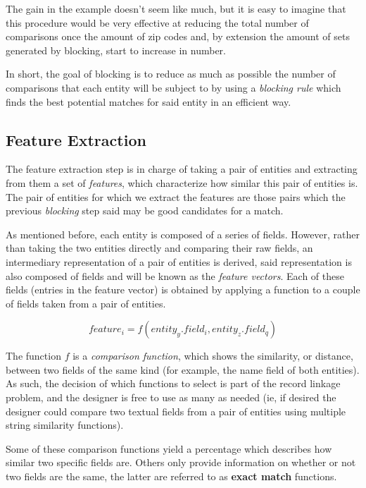 \documentclass[epsfig,a4paper,11pt,titlepage,twoside,openany]{book}
\begin{document}
The gain in the example doesn't seem like much, but it is easy to imagine that
this procedure would be very effective at reducing the total number of
comparisons once the amount of zip codes and, by extension the amount of sets
generated by blocking, start to increase in number.

In short, the goal of blocking is to reduce as much as possible the number of
comparisons that each entity will be subject to by using a \textit{blocking
  rule} which finds the best potential matches for said entity in an efficient
way.

  
\subsection{Feature Extraction}
\label{sec:rl-workflow-feat-extraction}

The feature extraction step is in charge of taking a pair of entities and
extracting from them a set of \textit{features}, which characterize how similar
this pair of entities is. The pair of entities for which we extract the features
are those pairs which the previous \textit{blocking} step said may be good
candidates for a match.

As mentioned before, each entity is composed of a series of fields. 
However, rather than
taking the two entities directly and comparing their raw fields, an intermediary representation of a pair of entities is derived, said representation is also
composed of fields and will be known as the \textit{feature vectors}. Each of
these fields (entries in the feature vector) is obtained by applying a function
to a couple of fields taken from a pair of entities.

$$
feature_i = f(entity_y.field_i , entity_z.field_q)
$$

The function $f$ is a \textit{comparison function}, which shows the
similarity, or distance, between two fields of the same kind (for example, the
name field of both entities). As such, the decision of which functions to select is
part of the record linkage problem, and the designer is free to use as many as needed (ie, if desired the designer could compare two textual fields from a pair of entities
using multiple string similarity functions).

Some of these comparison functions yield a percentage which describes how
similar two specific fields are. Others only provide information on whether or not two fields are the same,
the latter are referred to as \textbf{exact match} functions.
\end{document}
